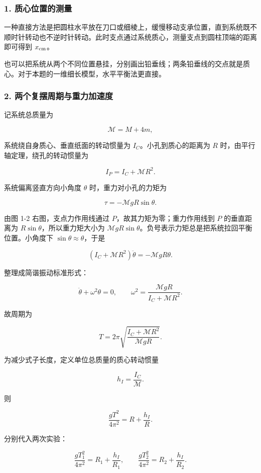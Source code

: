 \documentclass[12pt,a4paper,UTF8]{ctexart}
\begin{document}
\subsubsection{1.
质心位置的测量}\label{ux8d28ux5fc3ux4f4dux7f6eux7684ux6d4bux91cf}

一种直接方法是把圆柱水平放在刀口或细棱上，缓慢移动支承位置，直到系统既不顺时针转动也不逆时针转动。此时支点通过系统质心，测量支点到圆柱顶端的距离即可得到
\(x_{\rm cm}\)。

也可以把系统从两个不同位置悬挂，分别画出铅垂线；两条铅垂线的交点就是质心。对于本题的一维细长模型，水平平衡法更直接。

\subsubsection{2.
两个复摆周期与重力加速度}\label{ux4e24ux4e2aux590dux6446ux5468ux671fux4e0eux91cdux529bux52a0ux901fux5ea6}

记系统总质量为

\[
\mathcal M=M+4m,
\]

系统绕自身质心、垂直纸面的转动惯量为 \(I_C\)。小孔到质心的距离为 \(R\)
时，由平行轴定理，绕孔的转动惯量为

\[
I_P=I_C+\mathcal M R^2.
\]

系统偏离竖直方向小角度 \(\theta\) 时，重力对小孔的力矩为

\[
\tau=-\mathcal M gR\sin\theta.
\]

由图 1-2 右图，支点力作用线通过 \(P\)，故其力矩为零；重力作用线到 \(P\)
的垂直距离为 \(R\sin\theta\)，所以重力矩大小为
\(\mathcal M gR\sin\theta\)。负号表示力矩总是把系统拉回平衡位置。小角度下
\(\sin\theta\approx\theta\)，于是

\[
\left(I_C+\mathcal M R^2\right)\ddot\theta
=-\mathcal M gR\theta.
\]

整理成简谐振动标准形式：

\[
\ddot\theta+\omega^2\theta=0,
\qquad
\omega^2=\frac{\mathcal M gR}{I_C+\mathcal M R^2}.
\]

故周期为

\[
T=2\pi\sqrt{\frac{I_C+\mathcal M R^2}{\mathcal M gR}}.
\]

为减少式子长度，定义单位总质量的质心转动惯量

\[
h_I=\frac{I_C}{\mathcal M}.
\]

则

\[
\frac{gT^2}{4\pi^2}=R+\frac{h_I}{R}.
\]

分别代入两次实验：

\[
\frac{gT_1^2}{4\pi^2}=R_1+\frac{h_I}{R_1},
\qquad
\frac{gT_2^2}{4\pi^2}=R_2+\frac{h_I}{R_2}.
\]
\end{document}
